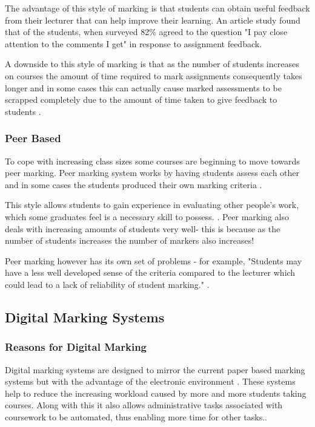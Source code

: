 \documentclass[12pt]{article}  %
\begin{document}
The advantage of this style of marking is that students can obtain useful feedback from their lecturer that can help improve their learning.  An article study \cite{higgins_conscientious_2002} found that of the students, when surveyed 82\% agreed to the question "I pay close attention to the comments I get" in response to assignment feedback.

A downside to this style of marking is that as the number of students increases on courses the amount of time required to mark assignments consequently takes longer and in some cases this can actually cause marked assessments to be scrapped completely due to the amount of time taken to give feedback to students \cite{brown_assessment_1999}.


\subsubsection{Peer Based}
To cope with increasing class sizes some courses are beginning to move towards peer marking. Peer marking system works by having students assess each other and in some cases  the students produced their own marking criteria \cite{orsmond_use_2000}.

This style allows  students to gain experience in evaluating other people's work, which some graduates feel is a necessary skill to possess. \cite{langan_insights_nodate}. Peer marking also deals with increasing amounts of students very well- this is because as the number of students increases the number of markers also increases!

Peer marking however has its own set of problems - for example, "Students may have a less well developed sense of the criteria compared to the lecturer which could lead to a lack of reliability of student marking." \cite{orsmond_use_2000}.



\subsection{Digital Marking Systems}

\subsubsection{Reasons for Digital Marking}
Digital marking systems are designed to mirror the current paper based marking systems but with the advantage of the electronic environment \cite{heinrich_online_2003}. These systems help to reduce the increasing workload caused by more and more students taking courses. Along with this it also allows administrative tasks associated with coursework to be automated, thus enabling more time for other tasks.\cite{joy_effective_1998}.
\end{document}
